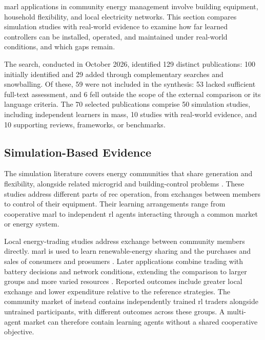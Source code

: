 \gls{marl} applications in community energy management involve building equipment, household flexibility, and local electricity networks. This section compares simulation studies with real-world evidence to examine how far learned controllers can be installed, operated, and maintained under real-world conditions, and which gaps remain.

The search, conducted in October 2026, identified 129 distinct publications: 100 initially identified and 29 added through complementary searches and snowballing. Of these, 59 were not included in the synthesis: 53 lacked sufficient full-text assessment, and 6 fell outside the scope of the external comparison or its language criteria. The 70 selected publications comprise 50 simulation studies, including independent learners in \glspl{mas}, 10 studies with real-world evidence, and 10 supporting reviews, frameworks, or benchmarks.

\subsection{Simulation-Based Evidence}
\label{sec:ch3-cross-domain}

The simulation literature covers energy communities that share generation and flexibility, alongside related microgrid and building-control problems \parencite{recV05,keren2024energynetworks,sajid2026marldrreview}. These studies address different parts of \gls{rec} operation, from exchanges between members to control of their equipment. Their learning arrangements range from cooperative \gls{marl} to independent \gls{rl} agents interacting through a common market or energy system.

Local energy-trading studies address exchange between community members directly. \gls{marl} is used to learn renewable-energy sharing and the purchases and sales of consumers and prosumers \parencite{recS01,recN12,recC12}. Later applications combine trading with battery decisions and network conditions, extending the comparison to larger groups and more varied resources \parencite{recS04,recN10,recN11}. Reported outcomes include greater local exchange and lower expenditure relative to the reference strategies. The community market of \textcite{recS02} instead contains independently trained \gls{rl} traders alongside untrained participants, with different outcomes across these groups. A multi-agent market can therefore contain learning agents without a shared cooperative objective.

